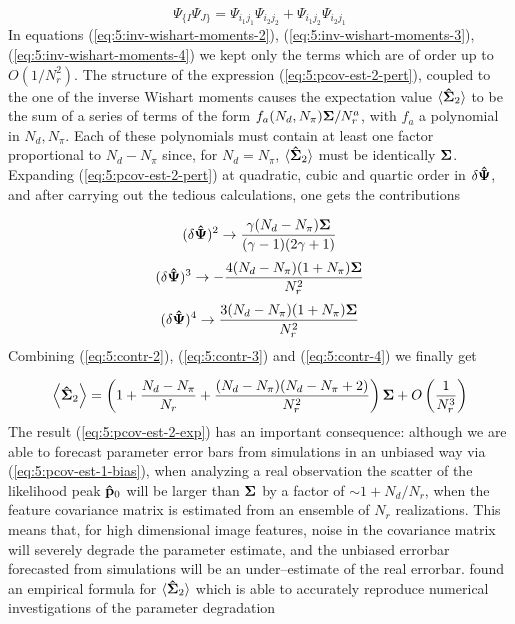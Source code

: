 \begin{equation}
\label{eq:5:symmind}
\Psi_{\{ I}\Psi_{J\}} = \Psi_{i_1j_1}\Psi_{i_2j_2} + \Psi_{i_1j_2}\Psi_{i_2j_1}
\end{equation}  
%
In equations (\ref{eq:5:inv-wishart-moments-2}), (\ref{eq:5:inv-wishart-moments-3}), (\ref{eq:5:inv-wishart-moments-4}) we kept only the terms which are of order up to $O(1/N_r^2)$. The structure of the expression (\ref{eq:5:pcov-est-2-pert}), coupled to the one of the inverse Wishart moments causes the expectation value $\langle\mathbf{\hat{\Sigma}}_2\rangle$ to be the sum of a series of terms of the form $f_a(N_d,N_\pi)\mathbf{\Sigma}/N_r^a$, with $f_a$ a polynomial in $N_d,N_\pi$. Each of these polynomials must contain at least one factor proportional to $N_d-N_\pi$ since, for $N_d=N_\pi$, $\langle\mathbf{\hat{\Sigma}}_2\rangle$ must be identically $\mathbf{\Sigma}$. Expanding (\ref{eq:5:pcov-est-2-pert}) at quadratic, cubic and quartic order in $\delta\mathbf{\hat{\Psi}}$, and after carrying out the tedious calculations, one gets the contributions

\begin{equation}
\label{eq:5:contr-2}
(\delta\mathbf{\hat{\Psi}})^2 \rightarrow \frac{\gamma(N_d-N_\pi)\mathbf{\Sigma}}{(\gamma-1)(2\gamma+1)}
\end{equation} 
%
\begin{equation}
\label{eq:5:contr-3}
(\delta\mathbf{\hat{\Psi}})^3 \rightarrow -\frac{4(N_d-N_\pi)(1+N_\pi)\mathbf{\Sigma}}{N_r^2}
\end{equation} 
%
\begin{equation}
\label{eq:5:contr-4}
(\delta\mathbf{\hat{\Psi}})^4 \rightarrow \frac{3(N_d-N_\pi)(1+N_\pi)\mathbf{\Sigma}}{N_r^2}
\end{equation} 
%
Combining (\ref{eq:5:contr-2}), (\ref{eq:5:contr-3}) and (\ref{eq:5:contr-4}) we finally get 

\begin{equation}
\label{eq:5:pcov-est-2-exp}
\left\langle\mathbf{\hat{\Sigma}}_2\right\rangle = \left(1+\frac{N_d-N_\pi}{N_r}+\frac{(N_d-N_\pi)(N_d-N_\pi+2)}{N_r^2}\right)\mathbf{\Sigma} + O\left(\frac{1}{N_r^3}\right)
\end{equation} 
%
The result (\ref{eq:5:pcov-est-2-exp}) has an important consequence: although we are able to forecast parameter error bars from simulations in an unbiased way via (\ref{eq:5:pcov-est-1-bias}), when analyzing a real observation the scatter of the likelihood peak $\mathbf{\hat{p}}_0$ will be larger than $\mathbf{\Sigma}$ by a factor of $\sim 1+N_d/N_r$, when the feature covariance matrix is estimated from an ensemble of $N_r$ realizations. This means that, for high dimensional image features, noise in the covariance matrix will severely degrade the parameter estimate, and the unbiased errorbar forecasted from simulations will be an under--estimate of the real errorbar. \citep{Taylor14} found an empirical formula for $\langle\mathbf{\hat{\Sigma}}_2\rangle$ which is able to accurately reproduce numerical investigations of the parameter degradation

